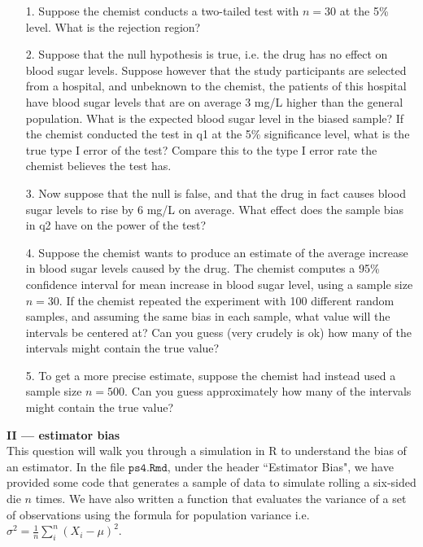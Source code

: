 \documentclass[10pt]{extarticle}
\begin{document}
\begin{itemize}

    \item[1.] Suppose the chemist conducts a two-tailed test with $n=30$ at the 5\% level. What is the rejection region? \\ 
	
	\item[2.] Suppose that the null hypothesis is true, i.e. the drug has no effect on blood sugar levels. Suppose however that the study participants are selected from a hospital, and unbeknown to the chemist, the patients of this hospital have blood sugar levels that are on average 3 mg/L higher than the general population. What is the expected blood sugar level in the biased sample? If the chemist conducted the test in q1 at the 5\% significance level, what is the true type I error of the test? Compare this to the type I error rate the chemist believes the test has.  \\ 

	\item[3.] Now suppose that the null is false, and that the drug in fact causes blood sugar levels to rise by 6 mg/L on average. What effect does the sample bias in q2 have on the power of the test? \\ 

	\item[4.] Suppose the chemist wants to produce an estimate of the average increase in blood sugar levels caused by the drug. The chemist computes a 95\% confidence interval for mean increase in blood sugar level, using a sample size $n=30$. If the chemist repeated the experiment with 100 different random samples, and assuming the same bias in each sample, what value will the intervals be centered at? Can you guess (very crudely is ok) how many of the intervals might contain the true value? \\ 
	
	\item[5.] To get a more precise estimate, suppose the chemist had instead used a sample size $n=500$. Can you guess approximately how many of the intervals might contain the true value?   

\end{itemize}




\hfill 

{\Large \bf II --- estimator bias}  \\

This question will walk you through a simulation in R to understand the bias of an estimator. In the file $\texttt{ps4.Rmd}$, under the header ``Estimator Bias", we have provided some code that generates a sample of data to simulate rolling a six-sided die $n$ times. We have also written a function that evaluates the variance of a set of observations using the formula for population variance i.e. $\sigma^2 = \frac 1n \sum_i^n (X_i - \mu)^2$. \\ 
\end{document}
